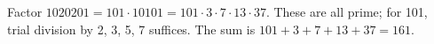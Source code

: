 Factor $1020201=101\cdot10101=101\cdot3\cdot7\cdot13\cdot37$. These are all prime; for 101, trial division by 2, 3, 5, 7 suffices. The sum is $101+3+7+13+37=\boxed{161}$.
